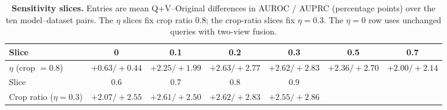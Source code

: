 \begin{table}[t]
\centering
\caption{\textbf{Sensitivity slices.} Entries are mean Q+V--Original differences in AUROC / AUPRC (percentage points) over the ten model--dataset pairs. The $\eta$ slices fix crop ratio 0.8; the crop-ratio slices fix $\eta=0.3$. The $\eta=0$ row uses unchanged queries with two-view fusion.}
\label{tab:supp-sensitivity-slices}
\small
\setlength{\tabcolsep}{5pt}
\begin{tabular*}{\textwidth}{@{\extracolsep{\fill}}lcccccc@{}}
\toprule
Slice & 0 & 0.1 & 0.2 & 0.3 & 0.5 & 0.7 \\
\midrule
$\eta$ (crop $=0.8$) & $+0.63/+0.44$ & $+2.25/+1.99$ & $+2.63/+2.77$ & $+2.62/+2.83$ & $+2.36/+2.70$ & $+2.00/+2.14$ \\
\midrule
Slice & 0.6 & 0.7 & 0.8 & 0.9 & & \\
\midrule
Crop ratio ($\eta=0.3$) & $+2.07/+2.55$ & $+2.61/+2.50$ & $+2.62/+2.83$ & $+2.55/+2.86$ & & \\
\bottomrule
\end{tabular*}
\end{table}
